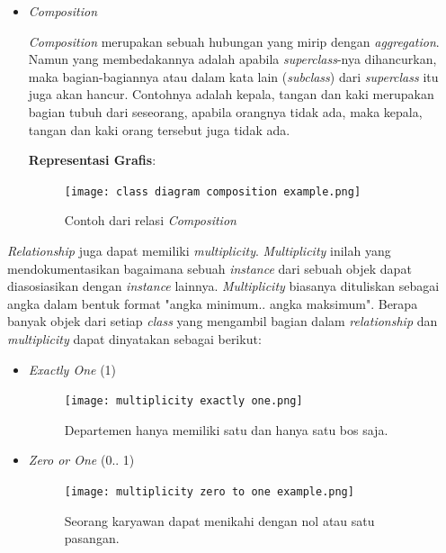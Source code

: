 \documentclass[a4paper]{article}
\begin{document}
\begin{enumerate}
\begin{itemize}
        \item \textit{Composition}

        \textit{Composition} merupakan sebuah hubungan yang mirip dengan \textit{aggregation}. Namun yang membedakannya adalah apabila \textit{superclass}-nya dihancurkan, maka bagian-bagiannya atau dalam kata lain (\textit{subclass}) dari \textit{superclass} itu juga akan hancur. Contohnya adalah kepala, tangan dan kaki merupakan bagian tubuh dari seseorang, apabila orangnya tidak ada, maka kepala, tangan dan kaki orang tersebut juga tidak ada\autocite{what-is-class-diagram}.

        \textbf{Representasi Grafis}:\\
        \begin{figure}[h]
            \centering
            \texttt{[image: class diagram composition example.png]}
            \caption{Contoh dari relasi \textit{Composition}}
        \end{figure}
    \end{itemize}
    \textit{Relationship} juga dapat memiliki \textit{multiplicity}. \textit{Multiplicity} inilah yang mendokumentasikan bagaimana sebuah \textit{instance} dari sebuah objek dapat diasosiasikan dengan \textit{instance} lainnya. \textit{Multiplicity} biasanya dituliskan sebagai angka dalam bentuk format "angka minimum.. angka maksimum"\autocite{systemanalysisdesign-class-diagram}. Berapa banyak objek dari setiap \textit{class} yang mengambil bagian dalam \textit{relationship} dan \textit{multiplicity} dapat dinyatakan sebagai berikut:
    \begin{itemize}
        \item \textit{Exactly One} (1)\\
        \begin{figure}[h]
            \centering
            \texttt{[image: multiplicity exactly one.png]}\\
            \caption{Departemen hanya memiliki satu dan hanya satu bos saja.}
        \end{figure}
        \item \textit{Zero or One} (0.. 1)\\
        \begin{figure}[h]
            \centering
            \texttt{[image: multiplicity zero to one example.png]}\\
            \caption{Seorang karyawan dapat menikahi dengan nol atau satu pasangan.}

\end{figure}
\end{itemize}
\end{enumerate}
\end{document}
